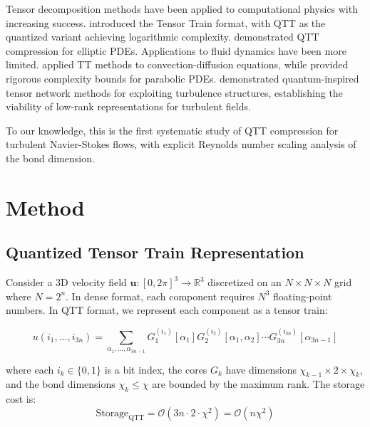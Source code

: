 \documentclass[preprint,12pt,authoryear]{elsarticle}
\newcommand{\bigO}{\mathcal{O}}
\newcommand{\R}{\mathbb{R}}
\theoremstyle{definition}
\begin{document}
Tensor decomposition methods have been applied to computational physics with increasing success.
\citet{oseledets2011tensor} introduced the Tensor Train format, with QTT as the quantized variant achieving logarithmic complexity.
\citet{khoromskij2011quantics} demonstrated QTT compression for elliptic PDEs.
Applications to fluid dynamics have been more limited.
\citet{dolgov2012fast} applied TT methods to convection-diffusion equations, while \citet{bachmayr2016tensor} provided rigorous complexity bounds for parabolic PDEs.
\citet{gourianov2022quantum} demonstrated quantum-inspired tensor network methods for exploiting turbulence structures, establishing the viability of low-rank representations for turbulent fields.

To our knowledge, this is the first systematic study of QTT compression for turbulent Navier-Stokes flows, with explicit Reynolds number scaling analysis of the bond dimension.

\section{Method}
\label{sec:method}

\subsection{Quantized Tensor Train Representation}

Consider a 3D velocity field $\mathbf{u}: [0, 2\pi]^3 \to \R^3$ discretized on an $N \times N \times N$ grid where $N = 2^n$.
In dense format, each component requires $N^3$ floating-point numbers.
In QTT format, we represent each component as a tensor train:

\begin{equation}
u(i_1, \ldots, i_{3n}) = \sum_{\alpha_1, \ldots, \alpha_{3n-1}} G_1^{(i_1)}[\alpha_1] G_2^{(i_2)}[\alpha_1, \alpha_2] \cdots G_{3n}^{(i_{3n})}[\alpha_{3n-1}]
\end{equation}

where each $i_k \in \{0, 1\}$ is a bit index, the cores $G_k$ have dimensions $\chi_{k-1} \times 2 \times \chi_k$, and the bond dimensions $\chi_k \leq \chi$ are bounded by the maximum rank.
The storage cost is:
\begin{equation}
\text{Storage}_{\text{QTT}} = \bigO(3n \cdot 2 \cdot \chi^2) = \bigO(n \chi^2)
\end{equation}
\end{document}
